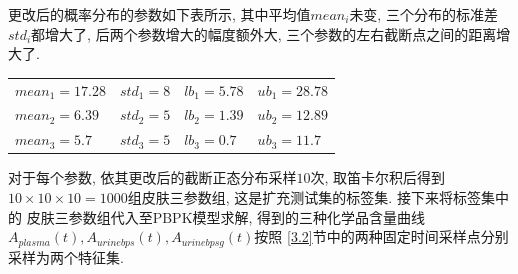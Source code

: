 \documentclass[a4paper,punct=banjiao,twoside]{ctexrep}
\theoremstyle{plain}
\theoremstyle{definition}
\theoremstyle{remark}
\begin{document}
\noindent 更改后的概率分布的参数如下表所示, 其中平均值$mean_i$未变, 三个分布的标准差$std_i$都增大了, 后两个参数增大的幅度额外大, 三个参数的左右截断点之间的距离增大了.

\begin{table}[htbp]
  \centering
  \begin{tabular}[t]{|l*{3}{l}|}

    $mean_1 = 17.28$ &$std_1 = 8$ &$lb_1 = 5.78$ &$ub_1 =28.78$  \\ 
  
    $mean_2 = 6.39$  &$std_2 = 5$ &$lb_2 = 1.39$ &$ ub_2 =12.89$  \\ 
  
    $mean_3 = 5.7$ &$std_3 = 5$  &$lb_3 = 0.7$ &$ub_3 =11.7$ \\ 

  \end{tabular}
\end{table}  


\noindent 对于每个参数, 依其更改后的截断正态分布采样$10$次, 取笛卡尔积后得到$10\times10\times10 = 1000$组皮肤三参数组, 这是扩充测试集的标签集. 接下来将标签集中的
皮肤三参数组代入至PBPK模型求解, 得到的三种化学品含量曲线$A_{plasma}(t), A_{urinebps}(t), A_{urinebpsg}(t)$按照
\ref{3.2}节中的两种固定时间采样点分别采样为两个特征集.
\end{document}
